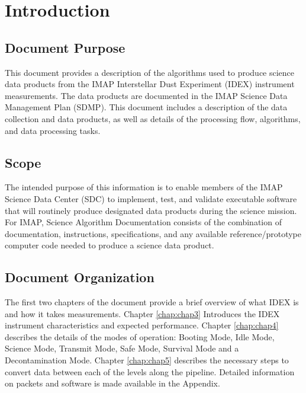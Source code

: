 \chapter{Introduction}
\section{Document Purpose}
This document provides a description of the algorithms used to produce science data products from the IMAP Interstellar Dust Experiment (IDEX) instrument measurements. The data products are documented in the IMAP Science Data Management Plan (SDMP). This document includes a description of the data collection and data products, as well as details of the processing flow, algorithms, and data processing tasks.
\section{Scope}
The intended purpose of this information is to enable members of the IMAP Science Data Center (SDC) to implement, test, and validate executable software that will routinely produce designated data products during the science mission. For IMAP, Science Algorithm Documentation consists of the combination of documentation, instructions, specifications, and any available reference/prototype computer code needed to produce a science data product.
\section{Document Organization}
The first two chapters of the document provide a brief overview of what IDEX is and how it takes measurements. Chapter \ref{chap:chap3} Introduces the IDEX instrument characteristics and expected performance. 
Chapter \ref{chap:chap4} describes the details of the modes of operation: Booting Mode, Idle Mode, Science Mode, Transmit Mode, Safe Mode, Survival Mode and a Decontamination Mode.  
Chapter \ref{chap:chap5} describes the necessary steps to convert data between each of the levels along the pipeline. Detailed information on packets and software is made available in the Appendix.


